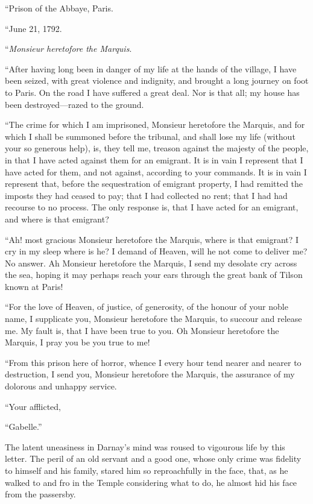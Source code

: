 ``Prison of the Abbaye, Paris.

``June 21, 1792.

``\emph{Monsieur heretofore the Marquis}.

``After having long been in danger of my life at the hands of the
village, I have been seized, with great violence and indignity, and
brought a long journey on foot to Paris.  On the road I have suffered
a great deal.  Nor is that all; my house has been destroyed---razed
to the ground.

``The crime for which I am imprisoned, Monsieur heretofore the
Marquis, and for which I shall be summoned before the tribunal, and
shall lose my life (without your so generous help), is, they tell me,
treason against the majesty of the people, in that I have acted
against them for an emigrant.  It is in vain I represent that I have
acted for them, and not against, according to your commands.  It is
in vain I represent that, before the sequestration of emigrant
property, I had remitted the imposts they had ceased to pay; that I
had collected no rent; that I had had recourse to no process.  The
only response is, that I have acted for an emigrant, and where is
that emigrant?

``Ah! most gracious Monsieur heretofore the Marquis, where is that
emigrant?  I cry in my sleep where is he?  I demand of Heaven, will
he not come to deliver me?  No answer.  Ah Monsieur heretofore the
Marquis, I send my desolate cry across the sea, hoping it may perhaps
reach your ears through the great bank of Tilson known at Paris!

``For the love of Heaven, of justice, of generosity, of the honour of
your noble name, I supplicate you, Monsieur heretofore the Marquis,
to succour and release me.  My fault is, that I have been true to you.
Oh Monsieur heretofore the Marquis, I pray you be you true to me!

``From this prison here of horror, whence I every hour tend nearer
and nearer to destruction, I send you, Monsieur heretofore the Marquis,
the assurance of my dolorous and unhappy service.


``Your afflicted,

``Gabelle.''


The latent uneasiness in Darnay's mind was roused to vigourous life
by this letter.  The peril of an old servant and a good one, whose
only crime was fidelity to himself and his family, stared him so
reproachfully in the face, that, as he walked to and fro in the Temple
considering what to do, he almost hid his face from the passersby.


